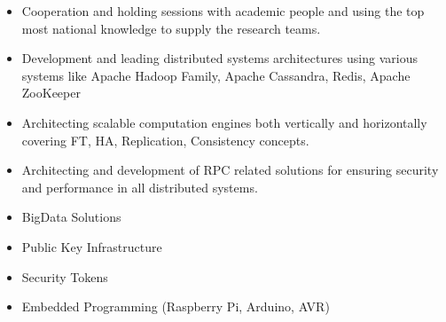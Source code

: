 \documentclass[10pt,a4paper]{article}
\begin{document}
\begin{itemize}
    \item \small Cooperation and holding sessions with academic people and using the top most national knowledge to supply the research teams.
    \item \small Development and leading distributed systems architectures using various systems like Apache Hadoop Family, Apache Cassandra, Redis, Apache ZooKeeper
    \item \small Architecting scalable computation engines both vertically and horizontally covering FT, HA, Replication, Consistency  concepts.
    \item \small Architecting and development of RPC related solutions for ensuring security and performance in all distributed systems.
     \item \small BigData Solutions
     \item \small Public Key Infrastructure
     \item \small Security Tokens
     \item \small Embedded Programming (Raspberry Pi, Arduino, AVR)
  \end{itemize}
  \setlength{\leftskip}{0pt}
  \setlength{\rightskip}{0cm}
	  
\end{document}
